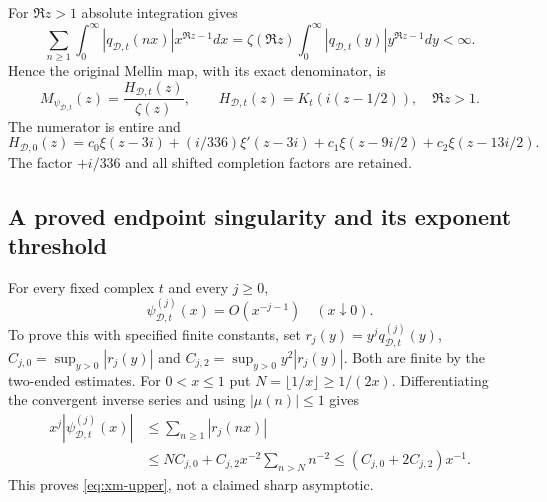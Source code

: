 For $\Re z>1$ absolute integration gives
\[
 \sum_{n\ge1}\int_0^\infty
 |q_{\mathcal D,t}(nx)|x^{\Re z-1}dx
 =\zeta(\Re z)\int_0^\infty
 |q_{\mathcal D,t}(y)|y^{\Re z-1}dy<\infty.
\]
Hence the original Mellin map, with its exact denominator, is
\begin{equation}\label{eq:xm-Mellin}
 M_{\psi_{\mathcal D,t}}(z)
 =\frac{H_{\mathcal D,t}(z)}{\zeta(z)},\qquad
 H_{\mathcal D,t}(z)=K_t(i(z-1/2)),\quad\Re z>1.
\end{equation}
The numerator is entire and
\[
 H_{\mathcal D,0}(z)=c_0\xi(z-3i)+(i/336)\xi'(z-3i)
                  +c_1\xi(z-9i/2)+c_2\xi(z-13i/2).
\]
The factor $+i/336$ and all shifted completion factors are retained.

\subsection{A proved endpoint singularity and its exponent threshold}

For every fixed complex $t$ and every $j\ge0$,
\begin{equation}\label{eq:xm-upper}
 \psi_{\mathcal D,t}^{(j)}(x)=O(x^{-j-1})\quad(x\downarrow0).
\end{equation}
To prove this with specified finite constants, set
$r_j(y)=y^j q_{\mathcal D,t}^{(j)}(y)$,
$C_{j,0}=\sup_{y>0}|r_j(y)|$ and
$C_{j,2}=\sup_{y>0}y^2|r_j(y)|$.
Both are finite by the two-ended estimates. For $0<x\le1$ put
$N=\lfloor1/x\rfloor\ge1/(2x)$. Differentiating the convergent
inverse series and using $|\mu(n)|\le1$ gives
\[
\begin{split}
 x^j|\psi_{\mathcal D,t}^{(j)}(x)|
 &\le\sum_{n\ge1}|r_j(nx)|\\
 &\le NC_{j,0}+C_{j,2}x^{-2}\sum_{n>N}n^{-2}
 \le(C_{j,0}+2C_{j,2})x^{-1}.
\end{split}
\]
This proves \eqref{eq:xm-upper}, not a claimed sharp asymptotic.

